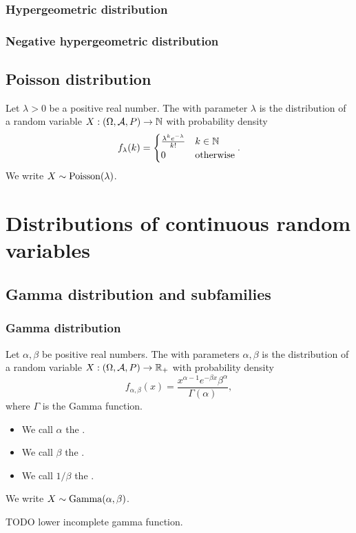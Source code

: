 \subsubsection{Hypergeometric distribution}
\subsubsection{Negative hypergeometric distribution}

\subsection{Poisson distribution}
\begin{definition}
Let $\lambda > 0$ be a positive real number. The  with parameter $\lambda$ is the distribution of a random variable $X: \left( \Omega, \mathcal{A}, P \right) \to \mathbb{N}$ with probability density
\[ f_\lambda(k) = \begin{cases}
\frac{\lambda^k e^{-\lambda}}{k!} & k\in\mathbb{N} \\
0 & \text{otherwise}
\end{cases}. \]
We write $X \sim \operatorname{Poisson}(\lambda)$.
\end{definition}

\section{Distributions of continuous random variables}
\subsection{Gamma distribution and subfamilies}
\subsubsection{Gamma distribution}
\begin{definition}
Let $\alpha, \beta$ be positive real numbers. The  with parameters $\alpha, \beta$ is the distribution of a random variable $X: \left( \Omega, \mathcal{A}, P \right) \to \mathbb{R}_+$ with probability density
\[ f_{\alpha,\beta}(x) = \frac{x^{\alpha-1}e^{-\beta x}\beta^\alpha}{\Gamma(\alpha)}, \]
where $\Gamma$ is the Gamma function.
\begin{itemize}
\item We call $\alpha$ the .
\item We call $\beta$ the .
\item We call $1/\beta$ the .
\end{itemize}
We write $X \sim \operatorname{Gamma}(\alpha,\beta)$.
\end{definition}
TODO lower incomplete gamma function.

